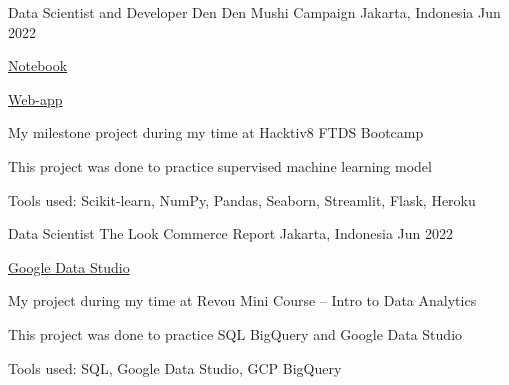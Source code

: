 \begin{cventries}
  \cventry
    {Data Scientist and Developer} %
    {Den Den Mushi Campaign} %
    {Jakarta, Indonesia} %
    {Jun 2022} %
    {
      \begin{cvitems} %
        \item {\href{https://github.com/NikkiSatmaka/dendenmushi-campaign/blob/main/h8dsft_Milestone2P1_nikki_satmaka.ipynb}{Notebook}}
        \item {\href{https://dendenmushi-campaign.herokuapp.com/}{Web-app}}
        \item {My milestone project during my time at Hacktiv8 FTDS Bootcamp}
        \item {This project was done to practice supervised machine learning model}
        \item {Tools used: Scikit-learn, NumPy, Pandas, Seaborn, Streamlit, Flask, Heroku}
      \end{cvitems}
    }

  \cventry
    {Data Scientist} %
    {The Look Commerce Report} %
    {Jakarta, Indonesia} %
    {Jun 2022} %
    {
      \begin{cvitems} %
        \item {\href{https://datastudio.google.com/s/vI4f1mokRRo}{Google Data Studio}}
        \item {My project during my time at Revou Mini Course – Intro to Data Analytics}
        \item {This project was done to practice SQL BigQuery and Google Data Studio}
        \item {Tools used: SQL, Google Data Studio, GCP BigQuery}
      \end{cvitems}
    }


\end{cventries}
